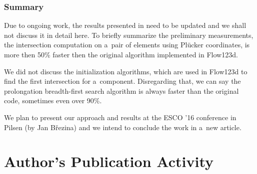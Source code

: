 \documentclass[FM,Dis]{tulthesis}
\begin{document}
\subsection{Summary}
Due to ongoing work, the results presented in \cite{fris_dp_2015} need to be updated and we shall not discuss
it in detail here. To briefly summarize the preliminary measurements, the intersection computation
on a~pair of elements using Pl\"{u}cker coordinates, is more then 50\% faster then the original algorithm 
implemented in Flow123d.

We did not discuss the initialization algorithms, which are used in Flow123d to find the first intersection 
for a~component. Disregarding that, we can say the prolongation breadth-first search algorithm is always faster
than the original code, sometimes even over 90\%.

We plan to present our approach and results at the ESCO '16 conference in Pilsen (by Jan B{\v r}ezina) and
we intend to conclude the work in a~new article.




\chapter{Author's Publication Activity} \label{chap:publications}
\end{document}
